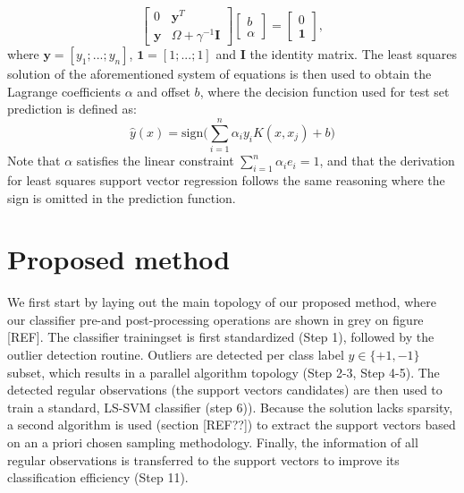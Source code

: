 \documentclass[preprint,12pt]{elsarticle}
\begin{document}
	\begin{equation}
	\begin{bmatrix}
	0 & \mathbf{y} ^T \\
	\mathbf{y} & \Omega + \gamma^{-1} \mathbf{I}
	\end{bmatrix}	
	\begin{bmatrix}
	b \\
	\alpha
	\end{bmatrix}
	=
	\begin{bmatrix}
	0 \\
	\mathbf{1}
	\end{bmatrix},
	\end{equation}
	where $\mathbf{y}  = [y_1;...;y_n]$, $\mathbf{1} = [1;...;1]$ and $\mathbf{I}$ the identity matrix.
	The least squares solution of the aforementioned system of equations is then used to  obtain the Lagrange coefficients $\alpha$ and offset $b$, where the decision function used for test set prediction is defined as:
	\begin{equation}
	\hat{y}(x) = \mathrm{sign}\Big(\sum_{i=1}^{n} \alpha_i y_i K(x, x_j) + b\Big)	
	\label{eq:classification}
	\end{equation}
Note that $\alpha$ satisfies the linear constraint $\sum_{i=1}^{n} \alpha_i  e_i = 1$, and that the derivation for least squares support vector regression follows the same reasoning where the sign is omitted in the prediction function. %
	
	
	\section{Proposed method}
	\label{sec:proposed}
	
	
	We first start by laying out the main topology of our proposed method, where our classifier pre-and post-processing operations are shown in grey on figure [REF]. The classifier trainingset is first standardized (Step 1), followed by the outlier detection routine. Outliers are detected per class label $y \in \{+1, -1\}$ subset, which results in a parallel algorithm topology (Step 2-3, Step 4-5).
	 The detected regular observations (the support vectors candidates) are then used to train a standard, LS-SVM classifier (step 6)). Because the solution lacks sparsity, a second algorithm is used (section [REF??]) to extract the support vectors based on an a priori chosen sampling methodology. Finally, the information of all regular observations is transferred to the support vectors to improve its classification efficiency (Step 11). \\
	
\end{document}
